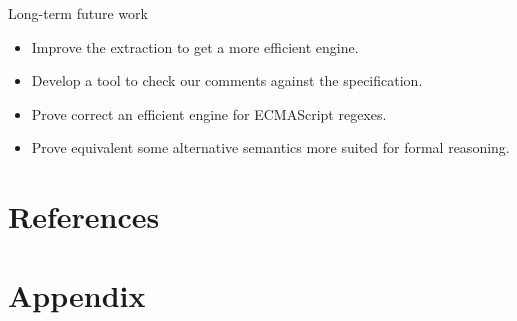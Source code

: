 \documentclass[aspectratio=169]{beamer}
\begin{document}
    \begin{frame}{Long-term future work}
        \begin{itemize}
            \item Improve the extraction to get a more efficient engine.
            \item Develop a tool to check our comments against the specification.
            \item Prove correct an efficient engine for ECMAScript regexes.
            \item Prove equivalent some alternative semantics more suited for formal reasoning.
        \end{itemize}
    \end{frame}

    \begin{frame}[standout]
        
    \end{frame}
    \appendix

    \section{References}
    \begin{frame}[allowframebreaks]
        \printbibliography[heading=none]{}
    \end{frame}


    \section{Appendix}
\end{document}
